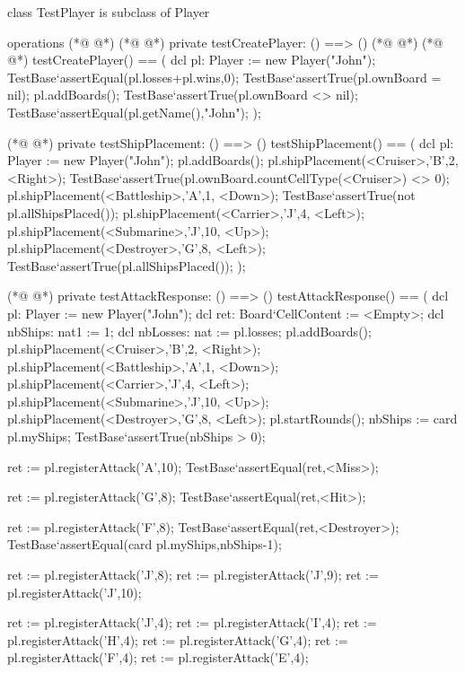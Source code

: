 \begin{vdmpp}[breaklines=true]
class TestPlayer is subclass of Player

operations
(*@
\label{createPlayer:4}
@*)
(*@
\label{testCreatePlayer:4}
@*)
 private testCreatePlayer: () ==> ()
(*@
\label{run:5}
@*)
(*@
\label{testCreateBoard:5}
@*)
  testCreatePlayer() == (
  dcl pl: Player := new Player("John");
  TestBase`assertEqual(pl.losses+pl.wins,0);
  TestBase`assertTrue(pl.ownBoard = nil);
  pl.addBoards();
  TestBase`assertTrue(pl.ownBoard <> nil);
  TestBase`assertEqual(pl.getName(),"John");
 );
 
(*@
\label{testShipPlacement:14}
@*)
 private testShipPlacement: () ==> ()
  testShipPlacement() == (
  dcl pl: Player := new Player("John");
  pl.addBoards();
  pl.shipPlacement(<Cruiser>,'B',2, <Right>);
  TestBase`assertTrue(pl.ownBoard.countCellType(<Cruiser>) <> 0);
  pl.shipPlacement(<Battleship>,'A',1, <Down>);
  TestBase`assertTrue(not pl.allShipsPlaced());
  pl.shipPlacement(<Carrier>,'J',4, <Left>);
  pl.shipPlacement(<Submarine>,'J',10, <Up>);
  pl.shipPlacement(<Destroyer>,'G',8, <Left>);
  TestBase`assertTrue(pl.allShipsPlaced());
 );
 
(*@
\label{testAttackResponse:28}
@*)
 private testAttackResponse: () ==> ()
  testAttackResponse() == (
   dcl pl: Player := new Player("John");
   dcl ret: Board`CellContent := <Empty>;
   dcl nbShips: nat1 := 1;
   dcl nbLosses: nat := pl.losses;
   pl.addBoards();
   pl.shipPlacement(<Cruiser>,'B',2, <Right>);
   pl.shipPlacement(<Battleship>,'A',1, <Down>);
   pl.shipPlacement(<Carrier>,'J',4, <Left>);
   pl.shipPlacement(<Submarine>,'J',10, <Up>);
   pl.shipPlacement(<Destroyer>,'G',8, <Left>);
   pl.startRounds();
   nbShips := card pl.myShips;
   TestBase`assertTrue(nbShips > 0);
   
   ret := pl.registerAttack('A',10);
   TestBase`assertEqual(ret,<Miss>);
   
   ret := pl.registerAttack('G',8);
   TestBase`assertEqual(ret,<Hit>);
   
   ret := pl.registerAttack('F',8);
   TestBase`assertEqual(ret,<Destroyer>);
   TestBase`assertEqual(card pl.myShips,nbShips-1);
   
   ret := pl.registerAttack('J',8);
   ret := pl.registerAttack('J',9);
   ret := pl.registerAttack('J',10);
   
   ret := pl.registerAttack('J',4);
   ret := pl.registerAttack('I',4);
   ret := pl.registerAttack('H',4);
   ret := pl.registerAttack('G',4);
   ret := pl.registerAttack('F',4);
   ret := pl.registerAttack('E',4);
   

\end{vdmpp}
